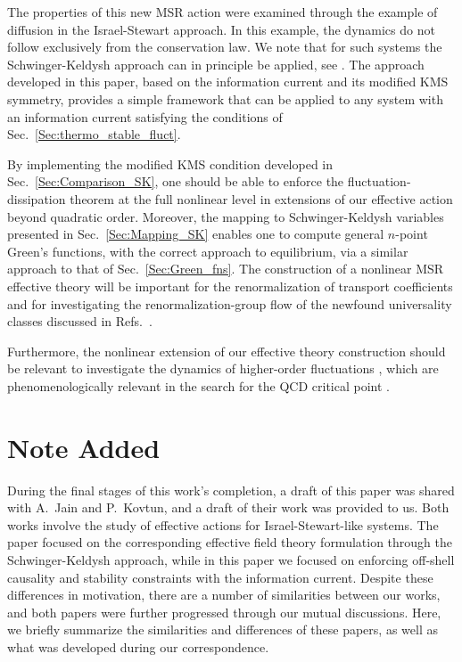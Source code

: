 \documentclass[aps,prd,nofootinbib,amsmath,amssymb,showpacs,longbibliography,singlecolumn,superscriptaddress,notitlepage]{revtex4-1}
\theoremstyle{plain}
\theoremstyle{definition}
\begin{document}
The properties of this new MSR action were examined through the example of diffusion in the Israel-Stewart approach.
In this example, the dynamics do not follow exclusively from the conservation law. We note that for such systems the Schwinger-Keldysh approach can in principle be applied, see \cite{JainKovtun:Placeholder}. The approach developed in this paper, based on the information current and its modified KMS symmetry, provides a simple framework that can be applied to any system with an information current satisfying the conditions of Sec.\ \ref{Sec:thermo_stable_fluct}. 

By implementing the modified KMS condition developed in Sec.~\ref{Sec:Comparison_SK}, one should be able to enforce the fluctuation-dissipation theorem at the full nonlinear level in extensions of our effective action beyond quadratic order. Moreover, the mapping to Schwinger-Keldysh variables presented in Sec.~\ref{Sec:Mapping_SK}  enables one to compute general $n$-point Green's functions, with the correct approach to equilibrium, via a similar approach to that of Sec.~\ref{Sec:Green_fns}. The construction of a nonlinear MSR effective theory will be important for the renormalization of transport coefficients \cite{Kovtun:2011np} and for investigating the renormalization-group flow of the  newfound universality classes discussed in  Refs.~\cite{Gavassino:2023odx, Gavassino:2023qwl}. 

Furthermore, the nonlinear extension of our effective theory construction should be relevant to investigate the dynamics of higher-order fluctuations  \cite{Mukherjee:2015swa,An:2019csj,An:2020vri,An:2022jgc}, which are phenomenologically relevant in the search for the QCD critical point \cite{Stephanov:2008qz,Athanasiou:2010kw,Mukherjee:2016kyu,Nahrgang:2018afz,Bluhm:2020mpc,Pihan:2022xcl,Almaalol:2022xwv,MUSES:2023hyz}.

\section*{Note Added}

During the final stages of this work's completion, a draft of this paper was shared with A.~Jain and P.~Kovtun, and a draft of their work \cite{JainKovtun:Placeholder} was provided to us. Both works involve the study of effective actions for Israel-Stewart-like systems. The paper \cite{JainKovtun:Placeholder} focused on the corresponding effective field theory formulation through the Schwinger-Keldysh approach, while in this paper we focused on enforcing off-shell causality and stability constraints with the information current. Despite these differences in motivation, there are a number of similarities between our works, and both papers were further progressed through our mutual discussions. Here, we briefly summarize the similarities and differences of these papers, as well as what was developed during our correspondence.
\end{document}
